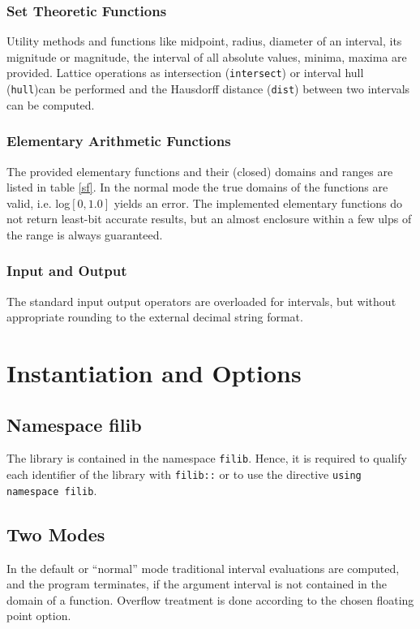 \documentclass{report}
\begin{document}
\subsection{Set Theoretic Functions}
Utility methods and functions  like midpoint, radius, diameter of an interval, its
mignitude or magnitude, the interval of all absolute values, minima, maxima are
provided. Lattice operations as intersection  (\verb|intersect|) or interval
 hull  (\verb|hull|)can be performed
and the Hausdorff distance  (\verb|dist|) between  two intervals can be
computed. 

\subsection{Elementary Arithmetic Functions}
 The provided elementary functions and their (closed) domains and ranges
are listed in table \ref{sf}. In the normal mode the true domains of
the functions are valid, i.e. log$[0,1.0]$ yields an error. 
The implemented elementary functions do not return least-bit accurate
results, but an almost enclosure within a few ulps
 of the range is always guaranteed.
 \subsection{Input and Output}
The standard input output operators are overloaded for intervals, but without
appropriate rounding to the external decimal string format.



	\chapter{Instantiation and Options}
		\section{Namespace filib}

The library is contained in the namespace
		\texttt{filib}. Hence, it is required to qualify each
		identifier of the library with \texttt{filib::}
		or to use the directive
		\texttt{using namespace filib}.

		\section{Two Modes}
In the default or ``normal'' mode traditional interval
evaluations are computed, and the program terminates, if the argument
interval is not contained in the domain of a function.
Overflow treatment is done according to the chosen floating point option.
\end{document}

